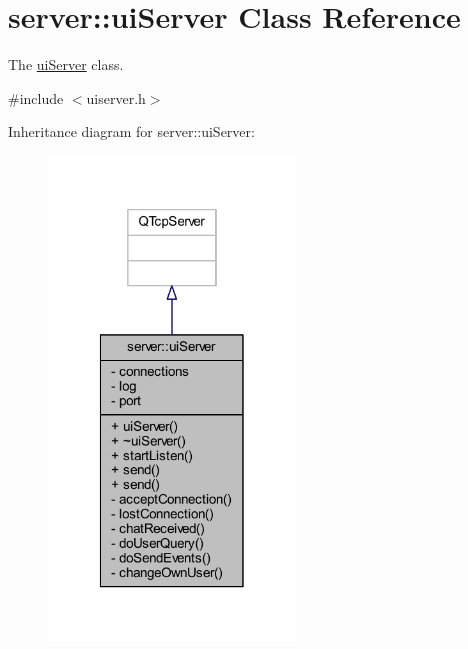 \hypertarget{classserver_1_1ui_server}{\section{server\-:\-:ui\-Server Class Reference}
\label{df/dd2/classserver_1_1ui_server}
}


The \hyperlink{classserver_1_1ui_server}{ui\-Server} class.  




{\ttfamily \#include $<$uiserver.\-h$>$}



Inheritance diagram for server\-:\-:ui\-Server\-:\nopagebreak
\begin{figure}[H]
\begin{center}
\leavevmode
\includegraphics[width=186pt]{d6/d9a/classserver_1_1ui_server__inherit__graph}
\end{center}
\end{figure}


